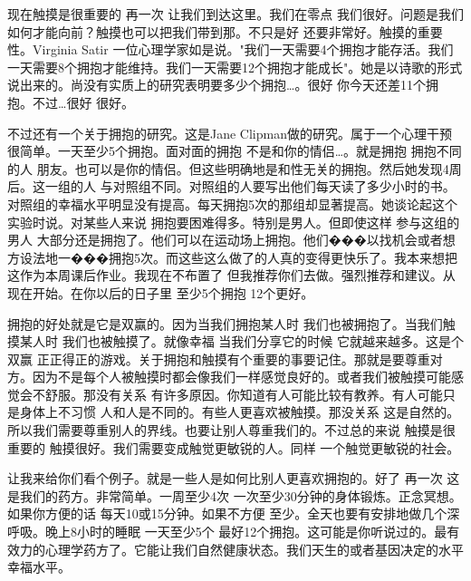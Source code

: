 现在触摸是很重要的 再一次 让我们到达这里。我们在零点 我们很好。问题是我们如何才能向前？触摸也可以把我们带到那。不只是好 还要非常好。触摸的重要性。Virginia Satir 一位心理学家如是说。"我们一天需要4个拥抱才能存活。我们一天需要8个拥抱才能维持。我们一天需要12个拥抱才能成长"。她是以诗歌的形式说出来的。尚没有实质上的研究表明要多少个拥抱…。很好 你今天还差11个拥抱。不过…很好 很好。 

不过还有一个关于拥抱的研究。这是Jane Clipman做的研究。属于一个心理干预 很简单。一天至少5个拥抱。面对面的拥抱 不是和你的情侣…。就是拥抱 拥抱不同的人 朋友。也可以是你的情侣。但这些明确地是和性无关的拥抱。然后她发现4周后。这一组的人 与对照组不同。对照组的人要写出他们每天读了多少小时的书。对照组的幸福水平明显没有提高。每天拥抱5次的那组却显著提高。她谈论起这个实验时说。对某些人来说 拥抱要困难得多。特别是男人。但即使这样 参与这组的男人 大部分还是拥抱了。他们可以在运动场上拥抱。他们���以找机会或者想方设法地一���拥抱5次。而这些这么做了的人真的变得更快乐了。我本来想把这作为本周课后作业。我现在不布置了 但我推荐你们去做。强烈推荐和建议。从现在开始。在你以后的日子里 至少5个拥抱 12个更好。 

拥抱的好处就是它是双赢的。因为当我们拥抱某人时 我们也被拥抱了。当我们触摸某人时 我们也被触摸了。就像幸福 当我们分享它的时候 它就越来越多。这是个双赢 正正得正的游戏。关于拥抱和触摸有个重要的事要记住。那就是要尊重对方。因为不是每个人被触摸时都会像我们一样感觉良好的。或者我们被触摸可能感觉会不舒服。那没有关系 有许多原因。你知道有人可能比较有教养。有人可能只是身体上不习惯 人和人是不同的。有些人更喜欢被触摸。那没关系 这是自然的。所以我们需要尊重别人的界线。也要让别人尊重我们的。不过总的来说 触摸是很重要的 触摸很好。我们需要变成触觉更敏锐的人。同样 一个触觉更敏锐的社会。 

让我来给你们看个例子。就是一些人是如何比别人更喜欢拥抱的。好了 再一次 这是我们的药方。非常简单。一周至少4次 一次至少30分钟的身体锻炼。正念冥想。如果你方便的话 每天10或15分钟。如果不方便 至少。全天也要有安排地做几个深呼吸。晚上8小时的睡眠 一天至少5个 最好12个拥抱。这可能是你听说过的。最有效力的心理学药方了。它能让我们自然健康状态。我们天生的或者基因决定的水平 幸福水平。 

